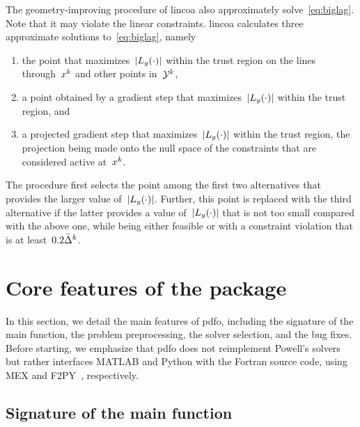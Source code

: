 The geometry-improving procedure of \gls{lincoa} also approximately solve~\cref{eq:biglag}.
Note that it may violate the linear constraints.
\Gls{lincoa} calculates three approximate solutions to~\cref{eq:biglag}, namely
\begin{enumerate}
    \item the point that maximizes~$\abs{\lagp[y](\cdot)}$ within the trust region on the lines through~$\iter[k]$ and other points in~$\xpt[k]$,
    \item a point obtained by a gradient step that maximizes~$\abs{\lagp[y](\cdot)}$ within the trust region, and
    \item a projected gradient step that maximizes~$\abs{\lagp[y](\cdot)}$ within the trust region, the projection being made onto the null space of the constraints that are considered active at~$\iter[k]$.
\end{enumerate}
The procedure first selects the point among the first two alternatives that provides the larger value of~$\abs{\lagp[y](\cdot)}$.
Further, this point is replaced with the third alternative if the latter provides a value of~$\abs{\lagp[y](\cdot)}$ that is not too small compared with the above one, while being either feasible or with a constraint violation that is at least~$0.2 \bar{\rad}^k$.

\section{Core features of the  package}
\label{sec:pdfo-core-features}

In this section, we detail the main features of \gls{pdfo}, including the signature of the main function, the problem preprocessing, the solver selection, and the bug fixes.
Before starting, we emphasize that \gls{pdfo} does not reimplement Powell's solvers but rather interfaces MATLAB and Python with the Fortran source code, using MEX and F2PY~\cite{Peterson_2009}, respectively.

\subsection{Signature of the main function}

